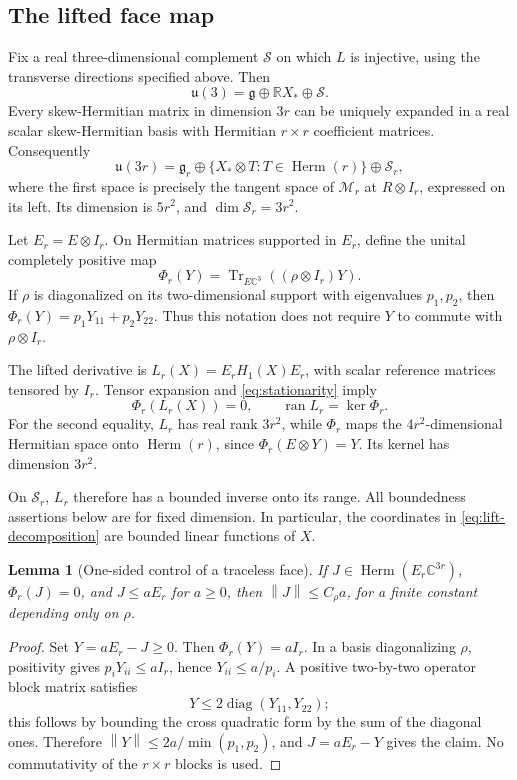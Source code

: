 \documentclass[11pt]{article}
\newtheorem{lemma}[theorem]{Lemma}
\theoremstyle{remark}\newtheorem{remark}[theorem]{Remark}
\newcommand{\C}{\mathbb C}
\newcommand{\R}{\mathbb R}
\newcommand{\Tr}{\operatorname{Tr}}
\newcommand{\diag}{\operatorname{diag}}
\newcommand{\Herm}{\operatorname{Herm}}
\newcommand{\ran}{\operatorname{ran}}
\newcommand{\norm}[1]{\left\lVert#1\right\rVert}
\newcommand{\gauge}{\mathfrak g}
\newcommand{\trans}{\mathcal S}
\begin{document}
\subsection{The lifted face map}
Fix a real three-dimensional complement $\trans$ on which $L$ is injective, using the transverse directions specified above. Then
\[
 \mathfrak u(3)=\gauge\oplus\R X_*\oplus\trans.
\]
Every skew-Hermitian matrix in dimension $3r$ can be uniquely expanded in a real scalar skew-Hermitian basis with Hermitian $r\times r$ coefficient matrices. Consequently
\begin{equation}\label{eq:lift-decomposition}
 \mathfrak u(3r)=\gauge_r\oplus
 \{X_*\otimes T:T\in\Herm(r)\}\oplus\trans_r,
\end{equation}
where the first space is precisely the tangent space of $\mathcal M_r$ at $R\otimes I_r$, expressed on its left. Its dimension is $5r^2$, and $\dim\trans_r=3r^2$.

Let $E_r=E\otimes I_r$. On Hermitian matrices supported in $E_r$, define the unital completely positive map
\begin{equation}\label{eq:Phi}
 \Phi_r(Y)=\Tr_{E\C^3}((\rho\otimes I_r)Y).
\end{equation}
If $\rho$ is diagonalized on its two-dimensional support with eigenvalues $p_1,p_2$, then $\Phi_r(Y)=p_1Y_{11}+p_2Y_{22}$. Thus this notation does not require $Y$ to commute with $\rho\otimes I_r$.

The lifted derivative is $L_r(X)=E_rH_1(X)E_r$, with scalar reference matrices tensored by $I_r$. Tensor expansion and \eqref{eq:stationarity} imply
\begin{equation}\label{eq:range}
 \Phi_r(L_r(X))=0,\qquad \ran L_r=\ker\Phi_r.
\end{equation}
For the second equality, $L_r$ has real rank $3r^2$, while $\Phi_r$ maps the $4r^2$-dimensional Hermitian space onto $\Herm(r)$, since $\Phi_r(E\otimes Y)=Y$. Its kernel has dimension $3r^2$.

On $\trans_r$, $L_r$ therefore has a bounded inverse onto its range. All boundedness assertions below are for fixed dimension. In particular, the coordinates in \eqref{eq:lift-decomposition} are bounded linear functions of $X$.

\begin{lemma}[One-sided control of a traceless face]\label{lem:face-bound}
If $J\in\Herm(E_r\C^{3r})$, $\Phi_r(J)=0$, and $J\le aE_r$ for $a\ge0$, then $\norm J\le C_\rho a$, for a finite constant depending only on $\rho$.
\end{lemma}
\begin{proof}
Set $Y=aE_r-J\ge0$. Then $\Phi_r(Y)=aI_r$. In a basis diagonalizing $\rho$, positivity gives $p_iY_{ii}\le aI_r$, hence $Y_{ii}\le a/p_i$. A positive two-by-two operator block matrix satisfies
\[
 Y\le2\diag(Y_{11},Y_{22});
\]
this follows by bounding the cross quadratic form by the sum of the diagonal ones. Therefore $\norm Y\le2a/\min(p_1,p_2)$, and $J=aE_r-Y$ gives the claim. No commutativity of the $r\times r$ blocks is used.
\end{proof}
\end{document}
